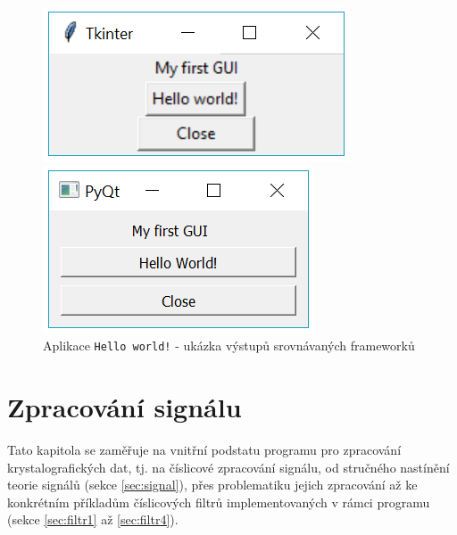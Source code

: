 \documentclass[a4paper, 12pt]{article}
\begin{document}
\begin{figure}[h!]
\centering
\begin{minipage}[b][4cm]{5cm}
  \centering
  \includegraphics[width=\linewidth]{tkinter_myfirstgui.png}\vspace{0.25cm}
\end{minipage}\hspace{1.5cm}
\begin{minipage}[b][4cm]{5cm}
  \centering
  \includegraphics[width=\linewidth]{pyqt_myfirstgui.png}\vspace{0.25cm}
\end{minipage}\vspace{0.4cm}
\caption{Aplikace \texttt{Hello world!} - ukázka výstupů srovnávaných frameworků}
\label{fig:myfirstgui}
\end{figure}

\newpage
\section{Zpracování signálu} \label{sec:DSP}
Tato kapitola se zaměřuje na vnitřní podstatu programu pro zpracování krystalografických dat, tj. na číslicové zpracování signálu, od stručného nastínění teorie signálů (sekce \ref{sec:signal}), přes problematiku jejich zpracování až ke konkrétním příkladům číslicových filtrů implementovaných v rámci programu (sekce \ref{sec:filtr1} až \ref{sec:filtr4}).
\end{document}
